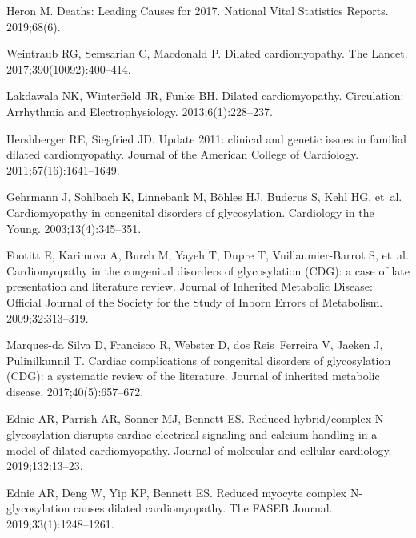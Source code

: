 \documentclass[10pt,letterpaper]{article}
\begin{document}
\begin{thebibliography}{10}
    Heron M.
    \newblock Deaths: Leading Causes for 2017.
    \newblock National Vital Statistics Reports. 2019;68(6).
    
    Weintraub RG, Semsarian C, Macdonald P.
    \newblock Dilated cardiomyopathy.
    \newblock The Lancet. 2017;390(10092):400--414.
    
    Lakdawala NK, Winterfield JR, Funke BH.
    \newblock Dilated cardiomyopathy.
    \newblock Circulation: Arrhythmia and Electrophysiology. 2013;6(1):228--237.
    
    Hershberger RE, Siegfried JD.
    \newblock Update 2011: clinical and genetic issues in familial dilated
    cardiomyopathy.
    \newblock Journal of the American College of Cardiology.
    2011;57(16):1641--1649.
    
    Gehrmann J, Sohlbach K, Linnebank M, B{\"o}hles HJ, Buderus S, Kehl HG, et~al.
    \newblock Cardiomyopathy in congenital disorders of glycosylation.
    \newblock Cardiology in the Young. 2003;13(4):345--351.
    
    Footitt E, Karimova A, Burch M, Yayeh T, Dupre T, Vuillaumier-Barrot S, et~al.
    \newblock Cardiomyopathy in the congenital disorders of glycosylation (CDG): a
    case of late presentation and literature review.
    \newblock Journal of Inherited Metabolic Disease: Official Journal of the
    Society for the Study of Inborn Errors of Metabolism. 2009;32:313--319.
    
    Marques-da Silva D, Francisco R, Webster D, dos Reis~Ferreira V, Jaeken J,
    Pulinilkunnil T.
    \newblock Cardiac complications of congenital disorders of glycosylation (CDG):
    a systematic review of the literature.
    \newblock Journal of inherited metabolic disease. 2017;40(5):657--672.
    
    Ednie AR, Parrish AR, Sonner MJ, Bennett ES.
    \newblock Reduced hybrid/complex N-glycosylation disrupts cardiac electrical
    signaling and calcium handling in a model of dilated cardiomyopathy.
    \newblock Journal of molecular and cellular cardiology. 2019;132:13--23.
    
    Ednie AR, Deng W, Yip KP, Bennett ES.
    \newblock Reduced myocyte complex N-glycosylation causes dilated
    cardiomyopathy.
    \newblock The FASEB Journal. 2019;33(1):1248--1261.
    

\end{thebibliography}
\end{document}
